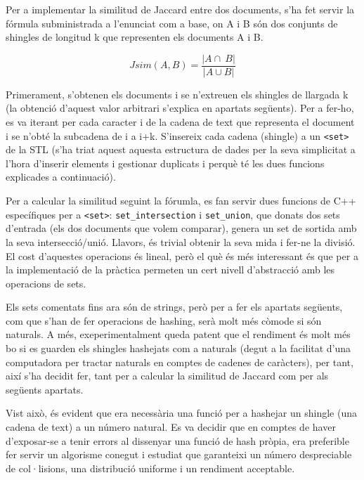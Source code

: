 \documentclass[catalan, 12pt]{report}
\begin{document}
Per a implementar la similitud de Jaccard entre dos documents, s'ha fet servir la fórmula subministrada a l'enunciat com a base, on A i B són dos conjunts de shingles de longitud k que representen els documents A i B.

\[Jsim(A,B) = \frac{| A \cap\ B |}{| A \cup B |}  \]

Primerament, s'obtenen els documents i se n'extreuen els shingles de llargada k (la obtenció d'aquest valor arbitrari s'explica en apartats següents). Per a fer-ho, es va iterant per cada caracter i de la cadena de text que representa el document i se n'obté la subcadena de i a i+k. S'insereix cada cadena (shingle) a un \verb|<set>| de la STL (s'ha triat aquest aquesta estructura de dades per la seva simplicitat a l'hora d'inserir elements i gestionar duplicats i perquè té les dues funcions explicades a continuació).\newline

Per a calcular la similitud seguint la fórumla, es fan servir dues funcions de C++ específiques per a \verb|<set>|: \verb|set_intersection| i \verb|set_union|, que donats dos sets d'entrada (els dos documents que volem comparar), genera un set de sortida amb la seva intersecció/unió. Llavors, és trivial obtenir la seva mida i fer-ne la divisió. El cost d'aquestes operacions és lineal, però el què és més interessant és que per a la implementació de la pràctica permeten un cert nivell d'abstracció amb les operacions de sets.\newline

Els sets comentats fins ara són de strings, però per a fer els apartats següents, com que s'han de fer operacions de hashing, serà molt més còmode si són naturals. A més, exeperimentalment queda patent que el rendiment és molt més bo si es guarden els shingles hashejats com a naturals (degut a la facilitat d'una computadora per tractar naturals en comptes de cadenes de caràcters), per tant, així s'ha decidit fer, tant per a calcular la similitud de Jaccard com per als següents apartats.\newline

Vist això, és evident que era necessària una funció per a hashejar un shingle (una cadena de text) a un número natural. Es va decidir que en comptes de haver d'exposar-se a tenir errors al dissenyar una funció de hash pròpia, era preferible fer servir un algorisme conegut i estudiat que garanteixi un número despreciable de col·lisions, una distribució uniforme i un rendiment acceptable.\newline
\end{document}
